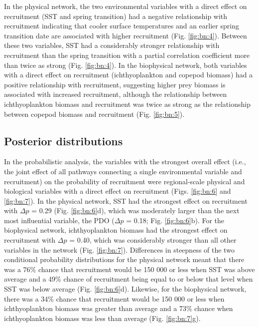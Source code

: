 In the physical network, the two environmental variables with a direct effect on
recruitment (SST and spring transition) had a negative relationship with
recruitment indicating that cooler surface temperatures and an earlier spring
transition date are associated with higher recruitment (Fig. \ref{fig:bn:4}).
Between these two variables, SST had a considerably stronger relationship with
recruitment than the spring transition with a partial correlation coefficient
more than twice as strong (Fig. \ref{fig:bn:4}). In the biophysical network,
both variables with a direct effect on recruitment (ichthyoplankton and copepod
biomass) had a positive relationship with recruitment, suggesting higher prey
biomass is associated with increased recruitment, although the relationship
between ichthyoplankton biomass and recruitment was twice as strong as the
relationship between copepod biomass and recruitment (Fig. \ref{fig:bn:5}).


\subsection{Posterior distributions}

In the probabilistic analysis, the variables with the strongest overall effect
(i.e., the joint effect of all pathways connecting a single environmental
variable and recruitment) on the probability of recruitment were regional-scale
physical and biological variables with a direct effect on recruitment (Figs.
\ref{fig:bn:6} and \ref{fig:bn:7}). In the physical network, SST had the
strongest effect on recruitment with \(\Delta p\) = 0.29 (Fig.
\ref{fig:bn:6}d), which was moderately larger than the next most influential
variable, the PDO (\(\Delta p\) = 0.18; Fig. \ref{fig:bn:6}b). For the
biophysical network, ichthyoplankton biomass had the strongest effect on
recruitment with \(\Delta p\) = 0.40, which was considerably stronger than all
other variables in the network (Fig. \ref{fig:bn:7}). Differences in steepness
of the two conditional probability distributions for the physical network meant
that there was a 76\% chance that recruitment would be 150 000 or less when SST
was above average and a 49\% chance of recruitment being equal to or below that
level when SST was below average (Fig. \ref{fig:bn:6}d). Likewise, for the
biophysical network, there was a 34\% chance that recruitment would be 150 000
or less when ichthyoplankton biomass was greater than average and a 73\% chance
when ichthyoplankton biomass was less than average (Fig. \ref{fig:bn:7}g).


